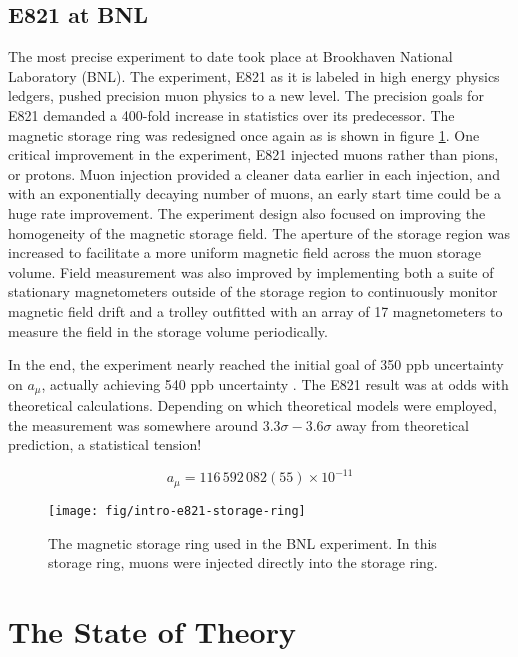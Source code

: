 \subsection{E821 at BNL}
The most precise \mugmtwo experiment to date took place at Brookhaven National Laboratory (BNL). The experiment, E821 as it is labeled in high energy physics ledgers, pushed precision muon physics to a new level.  The precision goals for E821 demanded a 400-fold increase in statistics over its predecessor.  The magnetic storage ring was redesigned once again as is shown in figure \ref{fig:intro-e821-storage-ring}.  One critical improvement in the experiment, E821 injected muons rather than pions, or protons.  Muon injection provided a cleaner data earlier in each injection, and with an exponentially decaying number of muons, an early start time could be a huge rate improvement.  The experiment design also focused on improving the homogeneity of the magnetic storage field.  The aperture of the storage region was increased to facilitate a more uniform magnetic field across the muon storage volume.  Field measurement was also improved by implementing both a suite of stationary magnetometers outside of the storage region to continuously monitor magnetic field drift and a trolley outfitted with an array of 17 magnetometers to measure the field in the storage volume periodically.

In the end, the experiment nearly reached the initial goal of 350 ppb uncertainty on $a_\mu$, actually achieving 540 ppb uncertainty \cite{e821-prd}.  The E821 \gmtwo result was at odds with theoretical calculations.  Depending on which theoretical models were employed, the measurement was somewhere around $3.3\sigma - 3.6\sigma$ away from theoretical prediction, a statistical tension!

\begin{equation}
\label{eqn:e821-results}
a_\mu = 116\,592\,082 (55) \times 10^{-11}
\end{equation}

\begin{figure}
\centering
\texttt{[image: fig/intro-e821-storage-ring]}
\caption{
    The magnetic storage ring used in the BNL experiment.  In this storage ring, muons were injected directly into the storage ring.
    \label{fig:intro-e821-storage-ring}
}
\end{figure}

\section{The State of Theory} \label{sec:theory}

